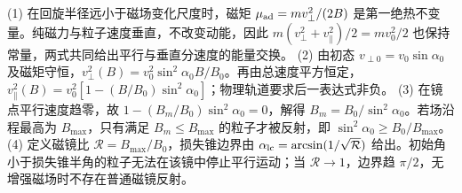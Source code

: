 (1) 在回旋半径远小于磁场变化尺度时，磁矩 \(\mu_{\rm ad}=mv_\perp^2/(2B)\) 是第一绝热不变量。纯磁力与粒子速度垂直，不改变动能，因此 \(m(v_\perp^2+v_\parallel^2)/2=mv_0^2/2\) 也保持常量，两式共同给出平行与垂直分速度的能量交换。
(2) 由初态 \(v_{\perp0}=v_0\sin\alpha_0\) 及磁矩守恒，\(v_\perp^2(B)=v_0^2\sin^2\alpha_0 B/B_0\)。再由总速度平方恒定，\(v_\parallel^2(B)=v_0^2[1-(B/B_0)\sin^2\alpha_0]\)；物理轨道要求后一表达式非负。
(3) 在镜点平行速度趋零，故 \(1-(B_m/B_0)\sin^2\alpha_0=0\)，解得 \(B_m=B_0/\sin^2\alpha_0\)。若场沿程最高为 \(B_{\max}\)，只有满足 \(B_m\le B_{\max}\) 的粒子才被反射，即 \(\sin^2\alpha_0\ge B_0/B_{\max}\)。
(4) 定义磁镜比 \(\mathcal R=B_{\max}/B_0\)，损失锥边界由 \(\alpha_{\rm lc}=\arcsin(1/\sqrt{\mathcal R})\) 给出。初始角小于损失锥半角的粒子无法在该镜中停止平行运动；当 \(\mathcal R\to1\)，边界趋 \(\pi/2\)，无增强磁场时不存在普通磁镜反射。
